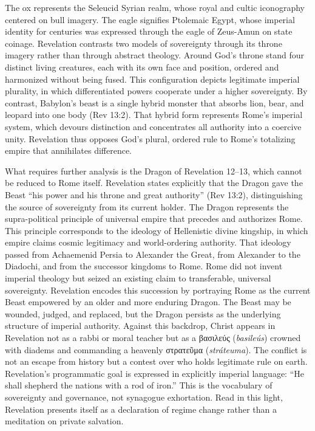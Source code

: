 The ox represents the Seleucid Syrian realm, whose royal and cultic iconography centered on bull imagery.
The eagle signifies Ptolemaic Egypt, whose imperial identity for centuries was expressed through the eagle of Zeus-Amun on state coinage.
Revelation contrasts two models of sovereignty through its throne imagery rather than through abstract theology.
Around God's throne stand four distinct living creatures, each with its own face and position, ordered and harmonized without being fused.
This configuration depicts legitimate imperial plurality, in which differentiated powers cooperate under a higher sovereignty.
By contrast, Babylon's beast is a single hybrid monster that absorbs lion, bear, and leopard into one body (Rev 13:2).
That hybrid form represents Rome's imperial system, which devours distinction and concentrates all authority into a coercive unity.
Revelation thus opposes God's plural, ordered rule to Rome's totalizing empire that annihilates difference.

What requires further analysis is the Dragon of Revelation 12--13, which cannot be reduced to Rome itself.
Revelation states explicitly that the Dragon gave the Beast ``his power and his throne and great authority'' (Rev 13:2), distinguishing the source of sovereignty from its current holder.
The Dragon represents the supra-political principle of universal empire that precedes and authorizes Rome.
This principle corresponds to the ideology of Hellenistic divine kingship, in which empire claims cosmic legitimacy and world-ordering authority.
That ideology passed from Achaemenid Persia to Alexander the Great, from Alexander to the Diadochi, and from the successor kingdoms to Rome.
Rome did not invent imperial theology but seized an existing claim to transferable, universal sovereignty.
Revelation encodes this succession by portraying Rome as the current Beast empowered by an older and more enduring Dragon.
The Beast may be wounded, judged, and replaced, but the Dragon persists as the underlying structure of imperial authority.
Against this backdrop, Christ appears in Revelation not as a rabbi or moral teacher but as a βασιλεύς (\emph{basileús}) crowned with diadems and commanding a heavenly στρατεῦμα (\emph{stráteuma}).
The conflict is not an escape from history but a contest over who holds legitimate rule on earth.
Revelation's programmatic goal is expressed in explicitly imperial language: ``He shall shepherd the nations with a rod of iron.''
This is the vocabulary of sovereignty and governance, not synagogue exhortation.
Read in this light, Revelation presents itself as a declaration of regime change rather than a meditation on private salvation.

